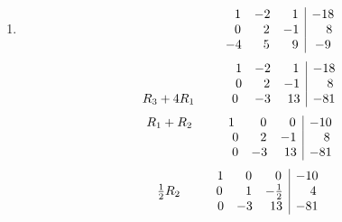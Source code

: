 \documentclass[12pt]{amsart}
\begin{document}
\begin{enumerate}
\begin{enumerate}
			\item 
			\begin{align}
				\begin{array}{ccc|c}
					\hspace{2.4cm} \text{ } \text{ } 1&-2& \text{ } \text{ } 1&-18 \\
					\hspace{2.4cm} \text{ } \text{ } 0& \text{ } \text{ } 2&-1& \text{ } \text{ } \text{ }8 \\
					\hspace{2.4cm} -4& \text{ } \text{ }5& \text{ } \text{ }9&-9
				\end{array} \notag
			\end{align} 
			\smallskip
			\begin{align}
				\begin{array}{ccc|c}
					 \hspace{2.7cm} 1&-2& \text{ } \text{ }1&-18 \\
					 \hspace{2.7cm} 0& \text{ } \text{ } 2&-1& \text{ } \text{ } \text{ }8 \\
					R_3+4R_1 \hspace{1.04cm}	0&-3& \text{ }13&-81
				\end{array} \notag
			\end{align} 
			\smallskip
			\begin{align}
				\begin{array}{ccc|c}
					R_1+R_2 \hspace{1cm} 1&\text{ } \text{ }0&\text{ } \text{ }0&-10 \\
					\hspace{2.5cm} 0& \text{ } \text{ } 2&-1& \text{ } \text{ } \text{ }8 \\
					\hspace{2.49cm} 0&-3& \text{ }13&-81
				\end{array} \notag
			\end{align} 
			\smallskip
			\begin{align}
				\begin{array}{ccc|c}
					\hspace{1.7cm} 1&\text{ } \text{ }0&\text{ } \text{ }0&-10 \\
					\frac{1}{2}R_2 \hspace{1cm} 0& \text{ } \text{ } 1&-\frac{1}{2}& \text{ } \text{ } \text{ }4 \\
					\hspace{1.72cm}0&-3& \text{ }13&-81
				\end{array} \notag

\end{align}
\end{enumerate}
\end{enumerate}
\end{document}
